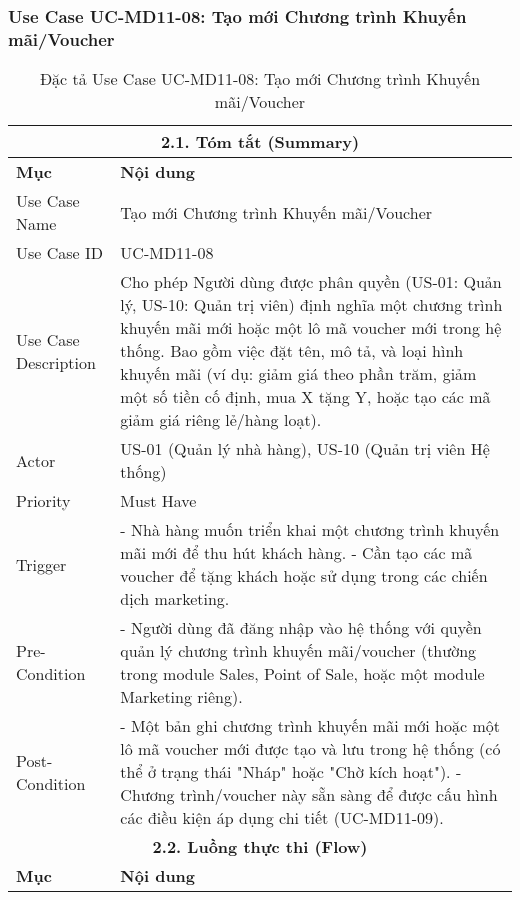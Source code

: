 \subsubsection{Use Case UC-MD11-08: Tạo mới Chương trình Khuyến mãi/Voucher}
\begin{longtable}{|m{4cm}|p{11cm}|}
\caption{Đặc tả Use Case UC-MD11-08: Tạo mới Chương trình Khuyến mãi/Voucher} \label{tab:uc_md11_08_create_promo_voucher} \\
\hline
\multicolumn{2}{|c|}{\textbf{2.1. Tóm tắt (Summary)}} \\
\hline
\textbf{Mục} & \textbf{Nội dung} \\
\hline
\endhead
\midrule
\endfoot
\bottomrule
\endlastfoot
Use Case Name & Tạo mới Chương trình Khuyến mãi/Voucher \\
\hline
Use Case ID & UC-MD11-08 \\
\hline
Use Case Description & Cho phép Người dùng được phân quyền (US-01: Quản lý, US-10: Quản trị viên) định nghĩa một chương trình khuyến mãi mới hoặc một lô mã voucher mới trong hệ thống. Bao gồm việc đặt tên, mô tả, và loại hình khuyến mãi (ví dụ: giảm giá theo phần trăm, giảm một số tiền cố định, mua X tặng Y, hoặc tạo các mã giảm giá riêng lẻ/hàng loạt). \\
\hline
Actor & US-01 (Quản lý nhà hàng), US-10 (Quản trị viên Hệ thống) \\
\hline
Priority & Must Have \\
\hline
Trigger & - Nhà hàng muốn triển khai một chương trình khuyến mãi mới để thu hút khách hàng. \newline - Cần tạo các mã voucher để tặng khách hoặc sử dụng trong các chiến dịch marketing. \\
\hline
Pre-Condition & - Người dùng đã đăng nhập vào hệ thống với quyền quản lý chương trình khuyến mãi/voucher (thường trong module Sales, Point of Sale, hoặc một module Marketing riêng). \\
\hline
Post-Condition & - Một bản ghi chương trình khuyến mãi mới hoặc một lô mã voucher mới được tạo và lưu trong hệ thống (có thể ở trạng thái "Nháp" hoặc "Chờ kích hoạt"). \newline - Chương trình/voucher này sẵn sàng để được cấu hình các điều kiện áp dụng chi tiết (UC-MD11-09). \\
\hline
\multicolumn{2}{|c|}{\textbf{2.2. Luồng thực thi (Flow)}} \\
\hline
\textbf{Mục} & \textbf{Nội dung} \\
\hline

\end{longtable}
